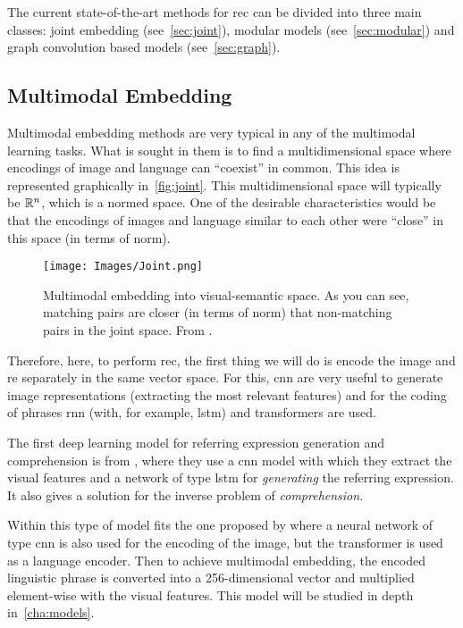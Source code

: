 The current state-of-the-art methods for \gls{rec} can be divided into three
main classes: joint embedding (see\ \vref{sec:joint}), modular models (see\
\vref{sec:modular}) and graph convolution based models (see\ \vref{sec:graph}).


\subsection{Multimodal Embedding}%
\label{sec:joint}

Multimodal embedding methods are very typical in any of the multimodal learning
tasks. What is sought in them is to find a multidimensional space where
encodings of image and language can ``coexist'' in common. This idea is
represented graphically in\ \vref{fig:joint}. This multidimensional space will
typically be \(\mathbb{R}^n\), which is a normed space. One of the desirable
characteristics would be that the encodings of images and language similar to
each other were ``close'' in this space (in terms of norm).

\begin{figure}[ht]
  \centering
  \texttt{[image: Images/Joint.png]}
  \caption[Multimodal embedding technique]{Multimodal embedding into
    visual-semantic space. As you can see, matching pairs are closer (in terms
    of norm) that non-matching pairs in the joint space. From
    .}%
  \label{fig:joint}
\end{figure}

Therefore, here, to perform \gls{rec}, the first thing we will do is encode the
image and \gls{re} separately in the same vector space. For this, \gls{cnn} are
very useful to generate image representations (extracting the most relevant
features) and for the coding of phrases \gls{rnn} (with, for example,
\gls{lstm}) and transformers are used.

The first deep learning model for referring expression generation and
comprehension is from \myCite{mao16:gener}, where they use a \gls{cnn} model
with which they extract the visual features and a network of type \gls{lstm}
for \emph{generating} the referring expression. It also gives a solution for
the inverse problem of \emph{comprehension}.

Within this type of model fits the one proposed by 
where a neural network of type \gls{cnn} is also used for the encoding of the
image, but the transformer is used as a language encoder. Then to achieve
multimodal embedding, the encoded linguistic phrase is converted into a
256-dimensional vector and multiplied element-wise with the visual
features. This model will be studied in depth in\ \vref{cha:models}.


